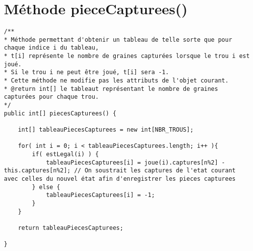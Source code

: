 \documentclass[11pt,a4paper]{report}
\begin{document}
\newpage

\section{Méthode pieceCapturees()}
\begin{lstlisting}
/**
* Méthode permettant d'obtenir un tableau de telle sorte que pour chaque indice i du tableau,
* t[i] représente le nombre de graines capturées lorsque le trou i est joué.
* Si le trou i ne peut être joué, t[i] sera -1.
* Cette méthode ne modifie pas les attributs de l'objet courant.
* @return int[] le tableaut représentant le nombre de graines capturées pour chaque trou.
*/
public int[] piecesCapturees() {
    
    int[] tableauPiecesCapturees = new int[NBR_TROUS];

    for( int i = 0; i < tableauPiecesCapturees.length; i++ ){
        if( estLegal(i) ) {
            tableauPiecesCapturees[i] = joue(i).captures[n%2] - this.captures[n%2]; // On soustrait les captures de l'etat courant avec celles du nouvel état afin d'enregistrer les pieces capturees
        } else {
            tableauPiecesCapturees[i] = -1;
        } 
    }

    return tableauPiecesCapturees;

}
\end{lstlisting}

\newpage
\end{document}
